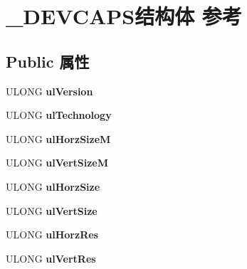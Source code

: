 \hypertarget{struct___d_e_v_c_a_p_s}{}\section{\+\_\+\+D\+E\+V\+C\+A\+P\+S结构体 参考}
\label{struct___d_e_v_c_a_p_s}
\subsection*{Public 属性}
\begin{DoxyCompactItemize}
\item 
\mbox{\label{struct___d_e_v_c_a_p_s_a506fd51e35f80c3fc63e60f34f4fca33}} 
U\+L\+O\+NG {\bfseries ul\+Version}
\item 
\mbox{\label{struct___d_e_v_c_a_p_s_a2c1adebe79887faf82e864b8ac230b4f}} 
U\+L\+O\+NG {\bfseries ul\+Technology}
\item 
\mbox{\label{struct___d_e_v_c_a_p_s_ac1f93602887b9574bf5ebce30f074ad6}} 
U\+L\+O\+NG {\bfseries ul\+Horz\+SizeM}
\item 
\mbox{\label{struct___d_e_v_c_a_p_s_ae471ab5edb263b7b18f9afced03622ba}} 
U\+L\+O\+NG {\bfseries ul\+Vert\+SizeM}
\item 
\mbox{\label{struct___d_e_v_c_a_p_s_a913f8e4d0f89876648dc2704737de2b2}} 
U\+L\+O\+NG {\bfseries ul\+Horz\+Size}
\item 
\mbox{\label{struct___d_e_v_c_a_p_s_a112e71536b487dd8f2bf8b89bfd65b85}} 
U\+L\+O\+NG {\bfseries ul\+Vert\+Size}
\item 
\mbox{\label{struct___d_e_v_c_a_p_s_aa7edab75f74c9fa76eeef9618aec12c0}} 
U\+L\+O\+NG {\bfseries ul\+Horz\+Res}
\item 
\mbox{\label{struct___d_e_v_c_a_p_s_ae0199d115c97371291e5f967858ef08d}} 
U\+L\+O\+NG {\bfseries ul\+Vert\+Res}
\item 
\mbox{\label{struct___d_e_v_c_a_p_s_a9eeb492addf51b85993712775e406b16}} 

\end{DoxyCompactItemize}
